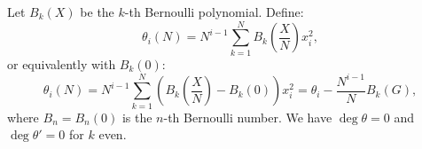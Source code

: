 Let $B_k(X)$ be the $k$-th Bernoulli polynomial. Define:
$$\theta_i(N) = N^{i-1} \sum_{k=1}^{N} B_k\left(\frac{X}{N}\right) x_i^2,$$
or equivalently with $B_k(0)$:
$$\theta_i(N) = N^{i-1} \sum_{k=1}^{N} \left(B_k\left(\frac{X}{N}\right) - B_k(0)\right) x_i^2 = \theta_i - \frac{N^{i-1}}{N} B_k(G),$$
where $B_n = B_n(0)$ is the $n$-th Bernoulli number. We have $\deg \theta = 0$ and $\deg \theta' = 0$ for $k$ even.
